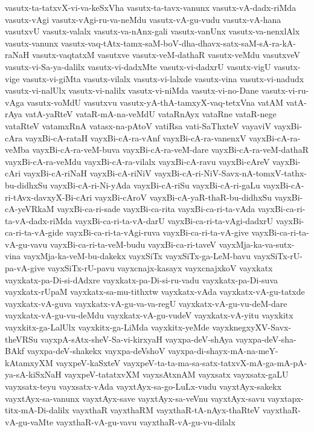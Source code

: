 {vasutx-ta-tatxvX-vi-va-keSxVha
vasutx-ta-tavx-vanunx
vasutx-vA-dadx-riMda
vasutx-vAgi
vasutx-vAgi-ru-va-neMdu
vasutx-vA-gu-vudu
vasutx-vA-hana
vasutxvU
vasutx-valalx
vasutx-va-nAnx-gali
vasutx-vanUnx
vasutx-va-nenxlAlx
vasutx-vanunx
vasutx-vaq-tAtx-tamx-saM-boV-dha-dhavx-satx-saM-sA-ra-kA-raNaH
vasutx-vaqtatxM
vasutxve
vasutx-veM-dathaR
vasutx-veMdu
vasutxveV
vasutx-vi-Sa-ya-dalilx
vasutx-vi-dadxMte
vasutx-vi-dadxrU
vasutx-vigU
vasutx-vige
vasutx-vi-giMta
vasutx-vilalx
vasutx-vi-lalxde
vasutx-vina
vasutx-vi-nadudx
vasutx-vi-nalUlx
vasutx-vi-nalilx
vasutx-vi-niMda
vasutx-vi-no-Dane
vasutx-vi-ru-vAga
vasutx-voMdU
vasutxvu
vasutx-yA-thA-tamxyX-vaq-tetxVna
vatAM
vatA-rAya
vatA-yaRteV
vataR-mA-na-veMdU
vataRnAyx
vataRne
vataR-nege
vataRteV
vatamxRnA
vatasx-na-pAtoV
vatiRsa
vati-SaThxteV
vayaviV
vayxBi-cAra
vayxBi-cA-rataH
vayxBi-cA-ra-vAnf
vayxBi-cA-ra-vanenxV
vayxBi-cA-ra-veMba
vayxBi-cA-ra-veM-buva
vayxBi-cA-ra-veM-dare
vayxBi-cA-ra-veM-dathaR
vayxBi-cA-ra-veMdu
vayxBi-cA-ra-vilalx
vayxBi-cA-ravu
vayxBi-cAreV
vayxBi-cAri
vayxBi-cA-riNaH
vayxBi-cA-riNiV
vayxBi-cA-ri-NiV-Savx-nA-tomxV-tathx-bu-didhxSu
vayxBi-cA-ri-Ni-yAda
vayxBi-cA-riSu
vayxBi-cA-ri-gaLu
vayxBi-cA-ri-tAvx-davxyX-Bi-cAri
vayxBi-cAroV
vayxBi-cA-yaR-thaR-bu-didhxSu
vayxBi-cA-yeVRkaM
vayxBi-ca-ri-sade
vayxBi-ca-rita
vayxBi-ca-ri-ta-vAda
vayxBi-ca-ri-ta-vA-dadx-riMda
vayxBi-ca-ri-ta-vA-darU
vayxBi-ca-ri-ta-vAgi-dadxrU
vayxBi-ca-ri-ta-vA-gide
vayxBi-ca-ri-ta-vAgi-ruva
vayxBi-ca-ri-ta-vA-give
vayxBi-ca-ri-ta-vA-gu-vavu
vayxBi-ca-ri-ta-veM-budu
vayxBi-ca-ri-taveV
vayxMja-ka-va-sutx-vina
vayxMja-ka-veM-bu-dakekx
vayxSiTx
vayxSiTx-ga-LeM-bavu
vayxSiTx-rU-pa-vA-give
vayxSiTx-rU-pavu
vayxcnajx-kasayx
vayxcnajxkoV
vayxkatx
vayxkatx-pa-Di-si-dAdxre
vayxkatx-pa-Di-si-ru-vadu
vayxkatx-pa-Di-suva
vayxkatx-rUpaM
vayxkatx-sa-mu-tithxtw
vayxkatx-vAda
vayxkatx-vA-gu-tatxde
vayxkatx-vA-guva
vayxkatx-vA-gu-va-va-regU
vayxkatx-vA-gu-vu-deM-dare
vayxkatx-vA-gu-vu-deMdu
vayxkatx-vA-gu-vudeV
vayxkatx-vA-yitu
vayxkitx
vayxkitx-ga-LalUlx
vayxkitx-ga-LiMda
vayxkitx-yeMde
vayxknegxyXV-Savx-theVRSu
vayxpA-sAtx-sheV-Sa-vi-kirxyaH
vayxpa-deV-shAya
vayxpa-deV-sha-BAkf
vayxpa-deV-shakekx
vayxpa-deVshoV
vayxpa-di-shayx-mA-na-meY-kAtamxyXM
vayxpeV-kaSxteV
vayxpeV-ta-ta-ma-sa-satx-tatxvX-mA-ga-mA-pA-ya-sA-kiSxNaH
vayxpeV-tatatxvXM
vayxsAtxnAM
vayxsatx
vayxsatx-gaLU
vayxsatx-teyu
vayxsatx-vAda
vayxtAyx-sa-go-LuLx-vudu
vayxtAyx-sakekx
vayxtAyx-sa-vanunx
vayxtAyx-save
vayxtAyx-sa-veVnu
vayxtAyx-savu
vayxtapx-titx-mA-Di-dalilx
vayxthaR
vayxthaRM
vayxthaR-tA-nAyx-thaRteV
vayxthaR-vA-gu-vaMte
vayxthaR-vA-gu-vavu
vayxthaR-vA-gu-vu-dilalx
}
